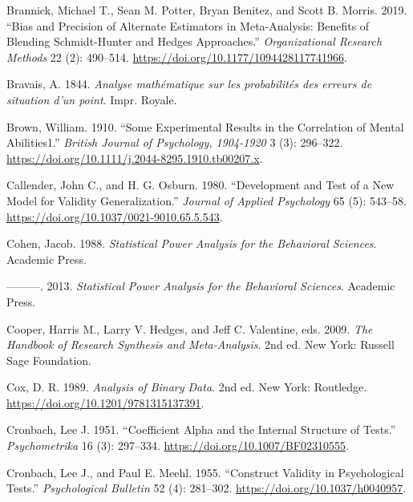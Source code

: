 \documentclass[
  letterpaper,
  DIV=11,
  numbers=noendperiod]{scrreprt}
\newlength{\cslhangindent}
\newlength{\cslentryspacingunit} %
\newenvironment{CSLReferences}[2] %
 {%
  \setlength{\parindent}{0pt}
  \ifodd #1
  \let\oldpar\par
  \def\par{\hangindent=\cslhangindent\oldpar}
  \fi
  \setlength{\parskip}{#2\cslentryspacingunit}
 }%
 {}
\begin{document}
\begin{CSLReferences}{1}{0}
\leavevmode{}%
Brannick, Michael T., Sean M. Potter, Bryan Benitez, and Scott B.
Morris. 2019. {``Bias and Precision of Alternate Estimators in
Meta-Analysis: Benefits of Blending Schmidt-Hunter and Hedges
Approaches.''} \emph{Organizational Research Methods} 22 (2): 490--514.
\url{https://doi.org/10.1177/1094428117741966}.

\leavevmode{}%
Bravais, A. 1844. \emph{Analyse mathématique sur les probabilités des
erreurs de situation d'un point}. Impr. Royale.

\leavevmode{}%
Brown, William. 1910. {``Some Experimental Results in the Correlation of
Mental Abilities1.''} \emph{British Journal of Psychology, 1904-1920} 3
(3): 296--322. \url{https://doi.org/10.1111/j.2044-8295.1910.tb00207.x}.

\leavevmode{}%
Callender, John C., and H. G. Osburn. 1980. {``Development and Test of a
New Model for Validity Generalization.''} \emph{Journal of Applied
Psychology} 65 (5): 543--58.
\url{https://doi.org/10.1037/0021-9010.65.5.543}.

\leavevmode{}%
Cohen, Jacob. 1988. \emph{Statistical Power Analysis for the Behavioral
Sciences}. Academic Press.

\leavevmode{}%
---------. 2013. \emph{Statistical Power Analysis for the Behavioral
Sciences}. Academic Press.

\leavevmode{}%
Cooper, Harris M., Larry V. Hedges, and Jeff C. Valentine, eds. 2009.
\emph{The Handbook of Research Synthesis and Meta-Analysis}. 2nd ed. New
York: Russell Sage Foundation.

\leavevmode{}%
Cox, D. R. 1989. \emph{Analysis of Binary Data}. 2nd ed. New York:
Routledge. \url{https://doi.org/10.1201/9781315137391}.

\leavevmode{}%
Cronbach, Lee J. 1951. {``Coefficient Alpha and the Internal Structure
of Tests.''} \emph{Psychometrika} 16 (3): 297--334.
\url{https://doi.org/10.1007/BF02310555}.

\leavevmode{}%
Cronbach, Lee J., and Paul E. Meehl. 1955. {``Construct Validity in
Psychological Tests.''} \emph{Psychological Bulletin} 52 (4): 281--302.
\url{https://doi.org/10.1037/h0040957}.


\end{CSLReferences}
\end{document}
